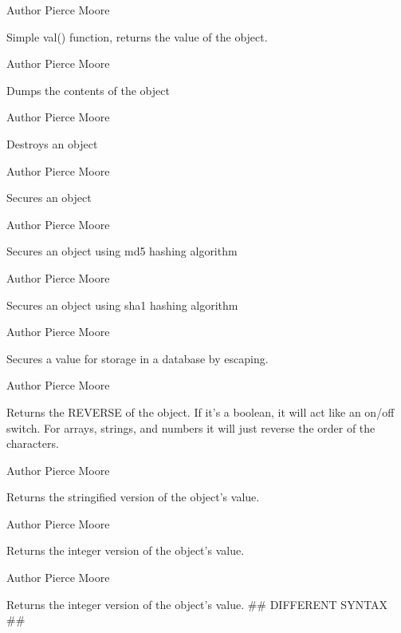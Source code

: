 \begin{DoxyAuthor}{Author}
Pierce Moore
\end{DoxyAuthor}
Simple val() function, returns the value of the object.

\begin{DoxyAuthor}{Author}
Pierce Moore
\end{DoxyAuthor}
Dumps the contents of the object

\begin{DoxyAuthor}{Author}
Pierce Moore
\end{DoxyAuthor}
Destroys an object

\begin{DoxyAuthor}{Author}
Pierce Moore
\end{DoxyAuthor}
Secures an object

\begin{DoxyAuthor}{Author}
Pierce Moore
\end{DoxyAuthor}
Secures an object using md5 hashing algorithm

\begin{DoxyAuthor}{Author}
Pierce Moore
\end{DoxyAuthor}
Secures an object using sha1 hashing algorithm

\begin{DoxyAuthor}{Author}
Pierce Moore
\end{DoxyAuthor}
Secures a value for storage in a database by escaping.

\begin{DoxyAuthor}{Author}
Pierce Moore
\end{DoxyAuthor}
Returns the R\-E\-V\-E\-R\-S\-E of the object. If it's a boolean, it will act like an on/off switch. For arrays, strings, and numbers it will just reverse the order of the characters.

\begin{DoxyAuthor}{Author}
Pierce Moore
\end{DoxyAuthor}
Returns the stringified version of the object's value.

\begin{DoxyAuthor}{Author}
Pierce Moore
\end{DoxyAuthor}
Returns the integer version of the object's value.

\begin{DoxyAuthor}{Author}
Pierce Moore
\end{DoxyAuthor}
Returns the integer version of the object's value. \#\# D\-I\-F\-F\-E\-R\-E\-N\-T S\-Y\-N\-T\-A\-X \#\#

